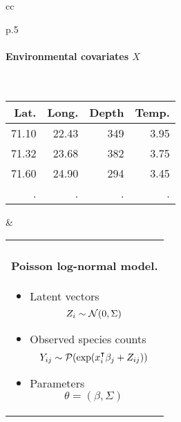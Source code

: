 {\begin{tabular}{cc}
\begin{tabular}{p{}}
      \bigskip \bigskip 
      \paragraph{Environmental covariates $X$} ~ \\
      {\footnotesize \begin{tabular}{rrrr}
        Lat. & Long. & Depth & Temp. \\
        \hline
        71.10 & 22.43 & 349 & 3.95 \\
        71.32 & 23.68 & 382 & 3.75 \\
        71.60 & 24.90 & 294 & 3.45 \\
        . & . & . & .
      \end{tabular}}     
    \end{tabular}
    & \pause
    \begin{tabular}{p{}}
      \bigskip \bigskip 
      \paragraph{Poisson log-normal model.} 
      \begin{itemize}
       \item \bigskip Latent vectors
       $$
       Z_i \sim \mathcal{N}(0, \Sigma)
       $$
       \item Observed species counts
       $$
       Y_{ij} \sim \mathcal{P}(\exp(x_i^\intercal \beta_j + Z_{ij}))
       $$
       \item Parameters
       $$
       \theta = (\beta, \Sigma)
       $$
      \end{itemize}
    \end{tabular}
  \end{tabular}
  
}
  
